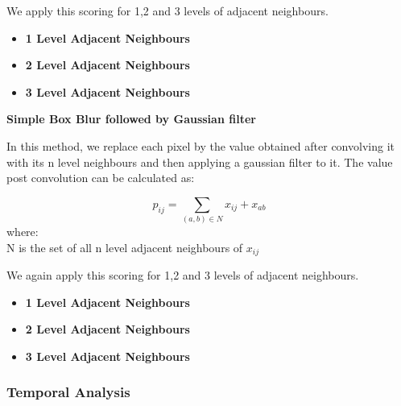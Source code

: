 We apply this scoring for 1,2 and 3 levels of adjacent neighbours.

\begin{itemize}
	\item {\bf 1 Level Adjacent Neighbours}
	\item {\bf 2 Level Adjacent Neighbours}
	\item {\bf 3 Level Adjacent Neighbours}
\end{itemize}

\noindent \textbf{Simple Box Blur followed by Gaussian filter}
 
In this method, we replace each pixel by the value obtained after convolving it with its n level neighbours and then applying a gaussian filter to it. The value post convolution can be calculated as:

\[p_{ij} = \sum_{(a,b) \in N}x_{ij} + x_{ab}\]
where:\\
N is the set of all n level adjacent neighbours of $x_{ij}$

We again apply this scoring for 1,2 and 3 levels of adjacent neighbours.

\begin{itemize}
	\item {\bf 1 Level Adjacent Neighbours}	
	\item {\bf 2 Level Adjacent Neighbours}
	\item {\bf 3 Level Adjacent Neighbours}
\end{itemize}


\subsubsection{Temporal Analysis}
\label{method:extentofchangetemporalanalysis}

